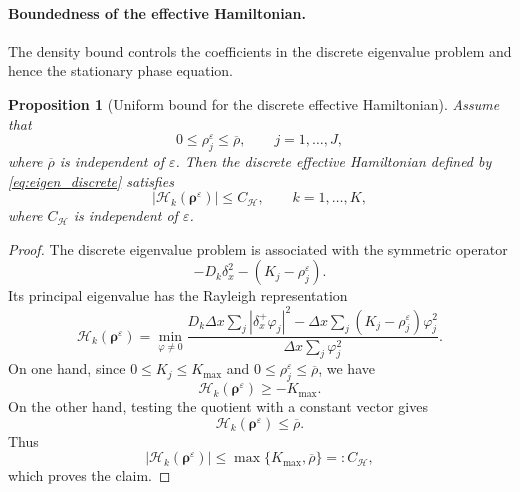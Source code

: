 \documentclass[11pt]{article}
\newtheorem{proposition}{Proposition}[section]
\begin{document}
\paragraph{Boundedness of the effective Hamiltonian.}
The density bound controls the coefficients in the discrete eigenvalue problem
and hence the stationary phase equation.

\begin{proposition}[Uniform bound for the discrete effective Hamiltonian]
\label{prop:stationary_H_bound}
Assume that
\[
    0\le \rho_j^\varepsilon\le \overline\rho,
    \qquad j=1,\ldots,J,
\]
where \(\overline\rho\) is independent of \(\varepsilon\).  Then the discrete
effective Hamiltonian defined by \eqref{eq:eigen_discrete} satisfies
\[
    |\mathcal H_k(\boldsymbol\rho^\varepsilon)|
    \le C_{\mathcal H},
    \qquad k=1,\ldots,K,
\]
where \(C_{\mathcal H}\) is independent of \(\varepsilon\).
\end{proposition}

\begin{proof}
The discrete eigenvalue problem is associated with the symmetric operator
\[
    -D_k\delta_x^2-(K_j-\rho_j^\varepsilon).
\]
Its principal eigenvalue has the Rayleigh representation
\[
    \mathcal H_k(\boldsymbol\rho^\varepsilon)
    =
    \min_{\varphi\ne0}
    \frac{
        D_k\Delta x\sum_j |\delta_x^+\varphi_j|^2
        -
        \Delta x\sum_j
        (K_j-\rho_j^\varepsilon)\varphi_j^2
    }{
        \Delta x\sum_j\varphi_j^2
    } .
\]
On one hand, since \(0\le K_j\le K_{\max}\) and
\(0\le\rho_j^\varepsilon\le\overline\rho\), we have
\[
    \mathcal H_k(\boldsymbol\rho^\varepsilon)\ge -K_{\max}.
\]
On the other hand, testing the quotient with a constant vector gives
\[
    \mathcal H_k(\boldsymbol\rho^\varepsilon)\le \overline\rho .
\]
Thus
\[
    |\mathcal H_k(\boldsymbol\rho^\varepsilon)|
    \le
    \max\{K_{\max},\overline\rho\}
    =:C_{\mathcal H},
\]
which proves the claim.
\end{proof}
\end{document}
